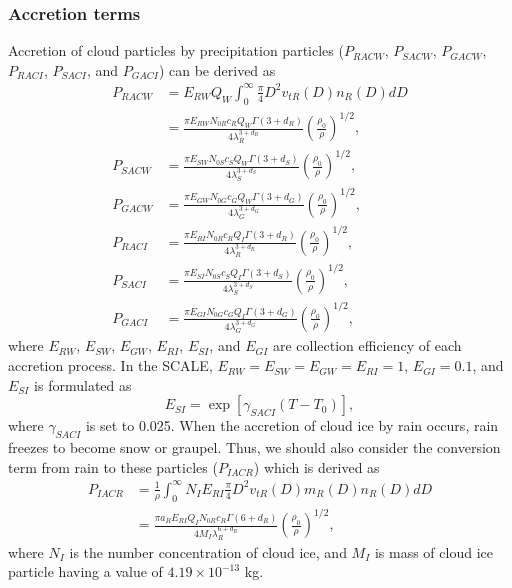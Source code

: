 \subsubsection{Accretion terms}
Accretion of cloud particles by precipitation particles ($P_{RACW}$, $P_{SACW}$, $P_{GACW}$, $P_{RACI}$, $P_{SACI}$, and $P_{GACI}$) can be derived as
\begin{align}
  P_{RACW} &=E_{RW}Q_{W}\int_{0}^{\infty}\frac{\pi}{4}D^{2}v_{tR}(D)n_{R}(D)dD \nonumber \\
  &=\frac{\pi E_{RW}N_{0R}c_{R}Q_{W}\Gamma(3+d_{R})}{4\lambda^{3+d_{R}}_{R}}\left(\frac{\rho_{0}}{\rho}\right)^{1/2}, \\
  P_{SACW} &=\frac{\pi E_{SW}N_{0S}c_{S}Q_{W}\Gamma(3+d_{S})}{4\lambda^{3+d_{S}}_{S}}\left(\frac{\rho_{0}}{\rho}\right)^{1/2}, \\
  P_{GACW} &=\frac{\pi E_{GW}N_{0G}c_{G}Q_{W}\Gamma(3+d_{G})}{4\lambda^{3+d_{G}}_{G}}\left(\frac{\rho_{0}}{\rho}\right)^{1/2}, \\
  P_{RACI} &=\frac{\pi E_{RI}N_{0R}c_{R}Q_{I}\Gamma(3+d_{R})}{4\lambda^{3+d_{R}}_{R}}\left(\frac{\rho_{0}}{\rho}\right)^{1/2}, \\
  P_{SACI} &=\frac{\pi E_{SI}N_{0S}c_{S}Q_{I}\Gamma(3+d_{S})}{4\lambda^{3+d_{S}}_{S}}\left(\frac{\rho_{0}}{\rho}\right)^{1/2}, \\
  P_{GACI} &=\frac{\pi E_{GI}N_{0G}c_{G}Q_{I}\Gamma(3+d_{G})}{4\lambda^{3+d_{G}}_{G}}\left(\frac{\rho_{0}}{\rho}\right)^{1/2},
\end{align}
where $E_{RW}$, $E_{SW}$, $E_{GW}$, $E_{RI}$, $E_{SI}$, and $E_{GI}$ are collection efficiency of each accretion process. In the SCALE, $E_{RW} = E_{SW} = E_{GW} = E_{RI} = 1$, $E_{GI} = 0.1$, and $E_{SI}$ is formulated as
\begin{equation}
  E_{SI}=\exp[\gamma_{SACI}(T-T_{0})],
\end{equation}
where $\gamma_{SACI}$ is set to 0.025. When the accretion of cloud ice by rain occurs, rain freezes to become snow or graupel. Thus, we should also consider the conversion term from rain to these particles ($P_{IACR}$) which is derived as
\begin{align}
  P_{IACR}&=\frac{1}{\rho}\int_{0}^{\infty}N_{I}E_{RI}\frac{\pi}{4}D^{2}v_{tR}(D)m_{R}(D)n_{R}(D)dD \nonumber \\
  &=\frac{\pi a_{R}E_{RI}Q_{I}N_{0R}c_{R}\Gamma(6+d_{R})}{4M_{I}\lambda^{6+d_{R}}_{R}}\left(\frac{\rho_{0}}{\rho}\right)^{1/2},
\end{align}
where $N_{I}$ is the number concentration of cloud ice, and $M_{I}$ is mass of cloud ice particle having a value of $4.19\times10^{-13}$ kg.

